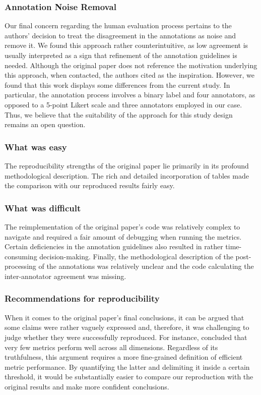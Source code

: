 \subsubsection{Annotation Noise Removal}
Our final concern regarding the human evaluation process pertains to the authors' decision to treat the disagreement in the annotations as noise and remove it. We found this approach rather counterintuitive, as low agreement is usually interpreted as a sign that refinement of the annotation guidelines is needed. Although the original paper does not reference the motivation underlying this approach, when contacted, the authors cited \citet{bhandari-etal-2020-evaluating} as the inspiration. However, we found that this work displays some differences from the current study. In particular, the annotation process involves a binary label and four annotators, as opposed to a 5-point Likert scale and three annotators employed in our case. Thus, we believe that the suitability of the approach for this study design remains an open question.


\subsubsection{What was easy}
The reproducibility strengths of the original paper lie primarily in its profound methodological description. The rich and detailed incorporation of tables made the comparison with our reproduced results fairly easy. 

\subsubsection{What was difficult}
The reimplementation of the original paper's code was relatively complex to navigate and required a fair amount of debugging when running the metrics. Certain deficiencies in the annotation guidelines also resulted in rather time-consuming decision-making. Finally, the methodological description of the post-processing of the annotations was relatively unclear and the code calculating the inter-annotator agreement was missing.

\subsubsection{Recommendations for reproducibility}

When it comes to the original paper's final conclusions, it can be argued that some claims were rather vaguely expressed and, therefore, it was challenging to judge whether they were successfully reproduced. For instance, \citet{gao2022dialsummeval} concluded that very few metrics perform well across all dimensions. Regardless of its truthfulness, this argument requires a more fine-grained definition of efficient metric performance. By quantifying the latter and delimiting it inside a certain threshold, it would be substantially easier to compare our reproduction with the original results and make more confident conclusions.

